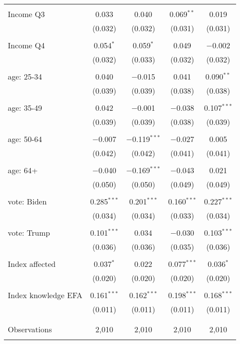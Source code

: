 \begin{tabular}{@{\extracolsep{5pt}}lcccc}
  & & & & \\ 
 Income Q3 & 0.033 & 0.040 & 0.069$^{**}$ & 0.019 \\ 
  & (0.032) & (0.032) & (0.031) & (0.031) \\ 
  & & & & \\ 
 Income Q4 & 0.054$^{*}$ & 0.059$^{*}$ & 0.049 & $-$0.002 \\ 
  & (0.032) & (0.033) & (0.032) & (0.032) \\ 
  & & & & \\ 
 age: 25-34 & 0.040 & $-$0.015 & 0.041 & 0.090$^{**}$ \\ 
  & (0.039) & (0.039) & (0.038) & (0.038) \\ 
  & & & & \\ 
 age: 35-49 & 0.042 & $-$0.001 & $-$0.038 & 0.107$^{***}$ \\ 
  & (0.039) & (0.039) & (0.038) & (0.039) \\ 
  & & & & \\ 
 age: 50-64 & $-$0.007 & $-$0.119$^{***}$ & $-$0.027 & 0.005 \\ 
  & (0.042) & (0.042) & (0.041) & (0.041) \\ 
  & & & & \\ 
 age: 64+ & $-$0.040 & $-$0.169$^{***}$ & $-$0.043 & 0.021 \\ 
  & (0.050) & (0.050) & (0.049) & (0.049) \\ 
  & & & & \\ 
 vote: Biden & 0.285$^{***}$ & 0.201$^{***}$ & 0.160$^{***}$ & 0.227$^{***}$ \\ 
  & (0.034) & (0.034) & (0.033) & (0.034) \\ 
  & & & & \\ 
 vote: Trump & 0.101$^{***}$ & 0.034 & $-$0.030 & 0.103$^{***}$ \\ 
  & (0.036) & (0.036) & (0.035) & (0.036) \\ 
  & & & & \\ 
 Index affected & 0.037$^{*}$ & 0.022 & 0.077$^{***}$ & 0.036$^{*}$ \\ 
  & (0.020) & (0.020) & (0.020) & (0.020) \\ 
  & & & & \\ 
 Index knowledge EFA & 0.161$^{***}$ & 0.162$^{***}$ & 0.198$^{***}$ & 0.168$^{***}$ \\ 
  & (0.011) & (0.011) & (0.011) & (0.011) \\ 
  & & & & \\ 
\hline \\[-1.8ex] 

Observations & 2,010 & 2,010 & 2,010 & 2,010 \\ 
\hline 
\hline \\[-1.8ex] 
\end{tabular} 